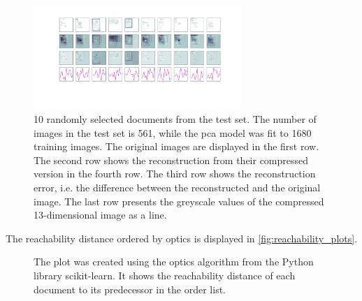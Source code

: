 \begin{figure}[htp] %
    \centering
    \includegraphics[width=0.7\textwidth]{images/Eigendocs/transformation/eigendocs.pdf}
    \caption[Preprocessing 10 randomly selected documents from the test set]{10 randomly selected documents from the test set.
    The number of images in the test set is 561, while the \ac{pca} model was fit to 1680 training images.
    The original images are displayed in the first row.
    The second row shows the reconstruction from their compressed version in the fourth row.
    The third row shows the reconstruction error, i.e. the difference between the reconstructed and the original image.
    The last row presents the greyscale values of the compressed 13-dimensional image as a line.
    }
    \label{fig:preprocessed_docs_eigendocs}
\end{figure}

The reachability distance ordered by \ac{optics} is displayed in \autoref{fig:reachability_plots}.

\begin{figure}%
    \centering
    \qquad
    \caption[Reachability distances]{The plot was created using the \ac{optics} algorithm from the Python library scikit-learn.
    It shows the reachability distance of each document to its predecessor in the order list.}%
    \label{fig:reachability_plots}%
\end{figure}

